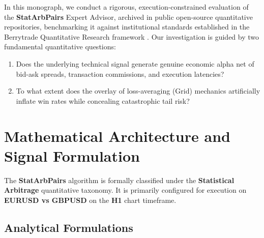 \documentclass[11pt,a4paper]{article}
\begin{document}
In this monograph, we conduct a rigorous, execution-constrained evaluation of the \textbf{StatArbPairs} Expert Advisor, archived in public open-source quantitative repositories, benchmarking it against institutional standards established in the Berrytrade Quantitative Research framework \cite{artsu2026illusion}. Our investigation is guided by two fundamental quantitative questions:
\begin{enumerate}
    \item Does the underlying technical signal generate genuine economic alpha net of bid-ask spreads, transaction commissions, and execution latencies?
    \item To what extent does the overlay of loss-averaging (Grid) mechanics artificially inflate win rates while concealing catastrophic tail risk?
\end{enumerate}

\section{Mathematical Architecture and Signal Formulation}
The \textbf{StatArbPairs} algorithm is formally classified under the \textbf{Statistical Arbitrage} quantitative taxonomy. It is primarily configured for execution on \textbf{EURUSD vs GBPUSD} on the \textbf{H1} chart timeframe.

\subsection{Analytical Formulations}
\end{document}
